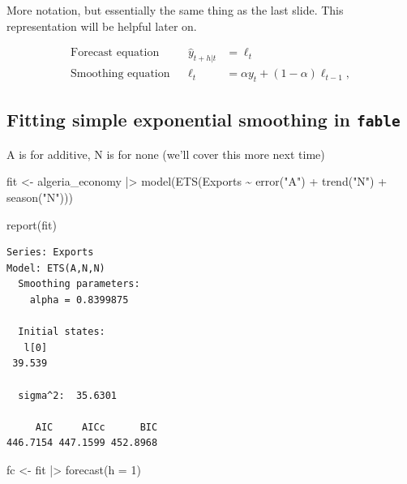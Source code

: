\documentclass[
  letterpaper,
  DIV=11,
  numbers=noendperiod]{scrartcl}
\newenvironment{Shaded}{\begin{snugshade}}{\end{snugshade}}
\newcommand{\AttributeTok}[1]{\textcolor[rgb]{0.40,0.45,0.13}{#1}}
\newcommand{\DecValTok}[1]{\textcolor[rgb]{0.68,0.00,0.00}{#1}}
\newcommand{\FunctionTok}[1]{\textcolor[rgb]{0.28,0.35,0.67}{#1}}
\newcommand{\NormalTok}[1]{\textcolor[rgb]{0.00,0.23,0.31}{#1}}
\newcommand{\OtherTok}[1]{\textcolor[rgb]{0.00,0.23,0.31}{#1}}
\newcommand{\SpecialCharTok}[1]{\textcolor[rgb]{0.37,0.37,0.37}{#1}}
\newcommand{\StringTok}[1]{\textcolor[rgb]{0.13,0.47,0.30}{#1}}
\begin{document}
More notation, but essentially the same thing as the last slide. This
representation will be helpful later on.

\[
\begin{align*}
  \text{Forecast equation}  && \hat{y}_{t+h|t} & = \ell_{t}\\
  \text{Smoothing equation} && \ell_{t}        & = \alpha y_{t} + (1 - \alpha)\ell_{t-1},
\end{align*}
\]

\subsection{\texorpdfstring{Fitting simple exponential smoothing in
\texttt{fable}}{Fitting simple exponential smoothing in fable}}\label{fitting-simple-exponential-smoothing-in-fable}

A is for additive, N is for none (we'll cover this more next time)

\begin{Shaded}
\begin{Highlighting}[]
\NormalTok{fit }\OtherTok{\textless{}{-}}\NormalTok{ algeria\_economy }\SpecialCharTok{|\textgreater{}}
  \FunctionTok{model}\NormalTok{(}\FunctionTok{ETS}\NormalTok{(Exports }\SpecialCharTok{\textasciitilde{}} \FunctionTok{error}\NormalTok{(}\StringTok{"A"}\NormalTok{) }\SpecialCharTok{+} \FunctionTok{trend}\NormalTok{(}\StringTok{"N"}\NormalTok{) }\SpecialCharTok{+} \FunctionTok{season}\NormalTok{(}\StringTok{"N"}\NormalTok{)))}

\FunctionTok{report}\NormalTok{(fit)}
\end{Highlighting}
\end{Shaded}

\begin{verbatim}
Series: Exports 
Model: ETS(A,N,N) 
  Smoothing parameters:
    alpha = 0.8399875 

  Initial states:
   l[0]
 39.539

  sigma^2:  35.6301

     AIC     AICc      BIC 
446.7154 447.1599 452.8968 
\end{verbatim}

\begin{Shaded}
\begin{Highlighting}[]
\NormalTok{fc }\OtherTok{\textless{}{-}}\NormalTok{ fit }\SpecialCharTok{|\textgreater{}}
  \FunctionTok{forecast}\NormalTok{(}\AttributeTok{h =} \DecValTok{1}\NormalTok{)}
\end{Highlighting}
\end{Shaded}
\end{document}
